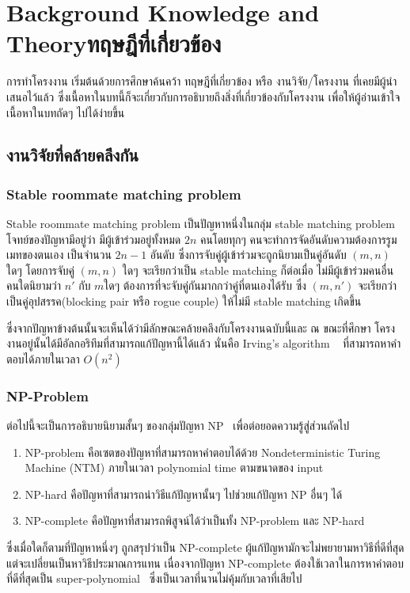 \chapter{\ifenglish Background Knowledge and Theory\else ทฤษฎีที่เกี่ยวข้อง\fi}

การทำโครงงาน เริ่มต้นด้วยการศึกษาค้นคว้า ทฤษฎีที่เกี่ยวข้อง หรือ งานวิจัย/โครงงาน 
ที่เคยมีผู้นำเสนอไว้แล้ว ซึ่งเนื้อหาในบทนี้ก็จะเกี่ยวกับการอธิบายถึงสิ่งที่เกี่ยวข้องกับโครงงาน 
เพื่อให้ผู้อ่านเข้าใจเนื้อหาในบทถัดๆ ไปได้ง่ายขึ้น

\section{งานวิจัยที่คล้ายคลึงกัน}
\label{sec:rmp}
\subsection{Stable roommate matching problem}
Stable roommate matching problem เป็นปัญหาหนึ่งในกลุ่ม stable matching problem
โจทย์ของปัญหามีอยู่ว่า มีผู้เข้าร่วมอยู่ทั้งหมด $2n$ คนโดยทุกๆ คนจะทำการจัดอันดับความต้องการรูมเมทของตนเอง
เป็นจำนวน $2n-1$ อันดับ ซึ่งการจับคู่ผู้เข้าร่วมจะถูกนิยามเป็นคู่อันดับ $(m,n)$ ใดๆ โดยการจับคู่ $(m,n)$ ใดๆ จะเรียกว่าเป็น
stable matching ก็ต่อเมื่อ ไม่มีผู้เข้าร่วมคนอื่นคนใดนิยามว่า $n'$ กับ $m$ใดๆ ต้องการที่จะจับคู่กันมากกว่าคู่ที่ตนเองได้รับ ซึ่ง $(m, n')$
จะเรียกว่าเป็นคู่อุปสรรค(blocking pair หรือ rogue couple) ให้ไม่มี stable matching เกิดขึ้น

ซึ่งจากปัญหาข้างต้นนั้นจะเห็นได้ว่ามีลักษณะคล้ายคลึงกับโครงงานฉบับนี้และ ณ ขณะที่ศึกษา
โครงงานอยู่นั้นได้มีอัลกอริทึมที่สามารถแก้ปัญหานี้ได้แล้ว นั่นคือ Irving's algorithm
~\cite{irving1985efficient} ที่สามารถหาคำตอบได้ภายในเวลา $O(n^2)$

\subsection{NP-Problem}
ต่อไปนี้จะเป็นการอธิบายนิยามสั้นๆ ของกลุ่มปัญหา NP~\cite{np} เพื่อต่อยอดความรู้สู่ส่วนถัดไป
\begin{enumerate}
      \item NP-problem คือเซตของปัญหาที่สามารถหาคำตอบได้ด้วย Nondeterministic
            Turing Machine (NTM) ภายในเวลา polynomial time ตามขนาดของ input
      \item  NP-hard คือปัญหาที่สามารถนำวิธีแก้ปัญหานั้นๆ ไปช่วยแก้ปัญหา NP อื่นๆ ได้
      \item  NP-complete คือปัญหาที่สามารถพิสูจน์ได้ว่าเป็นทั้ง NP-problem และ NP-hard
\end{enumerate}
ซึ่งเมื่อใดก็ตามที่ปัญหาหนึ่งๆ ถูกสรุปว่าเป็น NP-complete ผู้แก้ปัญหามักจะไม่พยายามหาวิธีที่ดีที่สุด
แต่จะเปลี่ยนเป็นหาวิธีประมาณการแทน เนื่องจากปัญหา NP-complete 
ต้องใช้เวลาในการหาคำตอบที่ดีที่สุดเป็น super-polynomial~\cite{np}
ซึ่งเป็นเวลาที่นานไม่คุ้มกับเวลาที่เสียไป



